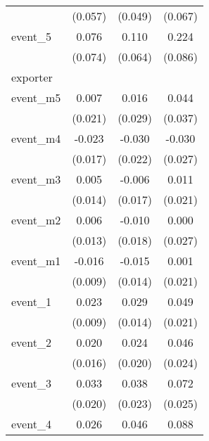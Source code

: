 {\begin{tabular}{l*{3}{c}}
            &     (0.057)         &     (0.049)         &     (0.067)         \\
[1em]
event\_5     &       0.076         &       0.110         &       0.224\sym{**} \\
            &     (0.074)         &     (0.064)         &     (0.086)         \\
\hline
exporter    &                     &                     &                     \\
event\_m5    &       0.007         &       0.016         &       0.044         \\
            &     (0.021)         &     (0.029)         &     (0.037)         \\
[1em]
event\_m4    &      -0.023         &      -0.030         &      -0.030         \\
            &     (0.017)         &     (0.022)         &     (0.027)         \\
[1em]
event\_m3    &       0.005         &      -0.006         &       0.011         \\
            &     (0.014)         &     (0.017)         &     (0.021)         \\
[1em]
event\_m2    &       0.006         &      -0.010         &       0.000         \\
            &     (0.013)         &     (0.018)         &     (0.027)         \\
[1em]
event\_m1    &      -0.016         &      -0.015         &       0.001         \\
            &     (0.009)         &     (0.014)         &     (0.021)         \\
[1em]
event\_1     &       0.023\sym{**} &       0.029\sym{*}  &       0.049\sym{*}  \\
            &     (0.009)         &     (0.014)         &     (0.021)         \\
[1em]
event\_2     &       0.020         &       0.024         &       0.046         \\
            &     (0.016)         &     (0.020)         &     (0.024)         \\
[1em]
event\_3     &       0.033         &       0.038         &       0.072\sym{**} \\
            &     (0.020)         &     (0.023)         &     (0.025)         \\
[1em]
event\_4     &       0.026         &       0.046\sym{*}  &       0.088\sym{***}\\

\end{tabular}}

